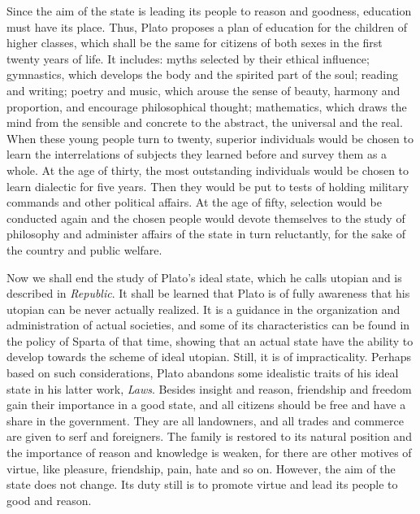 \documentclass[11pt]{article}
\begin{document}
Since the aim of the state is leading its people to reason and goodness, education must have its place. 
Thus, Plato proposes a plan of education for the children of higher classes, which shall be the same for citizens of both sexes in the first twenty years of life. 
It includes: 
myths selected by their ethical influence; 
gymnastics, which develops the body and the spirited part of the soul; 
reading and writing; 
poetry and music, which arouse the sense of beauty, harmony and proportion, and encourage philosophical thought; 
mathematics, which draws the mind from the sensible and concrete to the abstract, the universal and the real. 
When these young people turn to twenty, superior individuals would be chosen to learn the interrelations of subjects they learned before and survey them as a whole. 
At the age of thirty, the most outstanding individuals would be chosen to learn dialectic for five years. 
Then they would be put to tests of holding military commands and other political affairs. 
At the age of fifty, selection would be conducted again and the chosen people would devote themselves to the study of philosophy and administer affairs of the state in turn reluctantly, for the sake of the country and public welfare.

\newline

Now we shall end the study of Plato’s ideal state, which he calls utopian and is described in \textit{Republic}. 
It shall be learned that Plato is of fully awareness that his utopian can be never actually realized. 
It is a guidance in the organization and administration of actual societies, and some of its characteristics can be found in the policy of Sparta of that time, showing that an actual state have the ability to develop towards the scheme of ideal utopian. 
Still, it is of impracticality. 
Perhaps based on such considerations, Plato abandons some idealistic traits of his ideal state in his latter work, \textit{Laws}. 
Besides insight and reason, friendship and freedom gain their importance in a good state, and all citizens should be free and have a share in the government. 
They are all landowners, and all trades and commerce are given to serf and foreigners. 
The family is restored to its natural position and the importance of reason and knowledge is weaken, for there are other motives of virtue, like pleasure, friendship, pain, hate and so on. 
However, the aim of the state does not change. 
Its duty still is to promote virtue and lead its people to good and reason.
  
\end{document}

